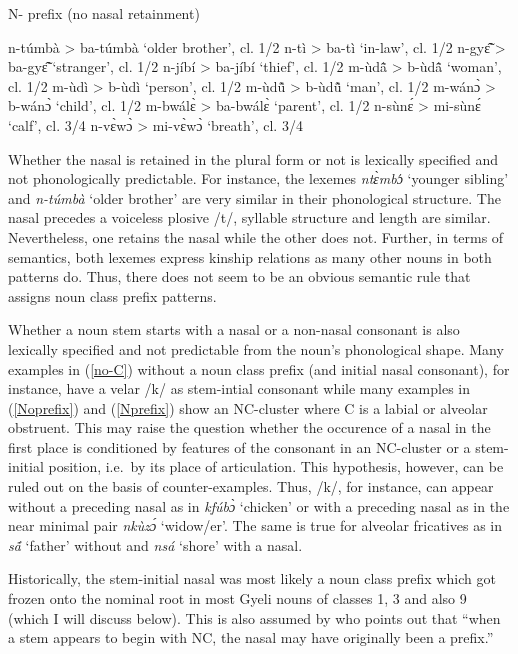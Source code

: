 \begin{exe} 
\ex\label{Nprefix} N- prefix (no nasal retainment)
\begin{xlist}
\ex n-túmbà > ba-túmbà `older brother', cl. 1/2
\ex n-tì >  ba-tì `in-law', cl. 1/2
\ex n-gyɛ̃̂ >  ba-gyɛ̃̂ `stranger', cl. 1/2
\ex n-jíbí >  ba-jíbí `thief', cl. 1/2
\ex m-ùdã̂ >  b-ùdã̂ `woman', cl. 1/2
\ex m-ùdì >  b-ùdì `person', cl. 1/2
\ex m-ùdũ̂ >  b-ùdũ̂ `man', cl. 1/2
\ex m-wánɔ̀ >  b-wánɔ̀ `child', cl. 1/2
\ex m-bwálɛ̀ >  ba-bwálɛ̀ `parent', cl. 1/2
\ex n-sùnɛ́ >  mi-sùnɛ́ `calf', cl. 3/4
\ex n-vɛ̀wɔ̀ >  mi-vɛ̀wɔ̀ `breath', cl. 3/4
\end{xlist}
\end{exe}

Whether the nasal is retained in the plural form or not is lexically specified and not phonologically predictable.  For instance, the lexemes {\itshape ntɛ̀mbɔ}́ `younger sibling' and {\itshape n-túmbà} `older brother' are very similar in their phonological structure. The nasal precedes a voiceless plosive /t/, syllable structure and length are similar. Nevertheless, one retains the nasal while the other does not.  Further, in terms of semantics, both lexemes express kinship relations as many other nouns in both patterns do. Thus, there does not seem to be an obvious semantic rule that assigns noun class prefix patterns.

Whether a noun stem starts with a nasal or a non-nasal consonant is also lexically specified and not predictable from the noun's phonological shape. Many examples in (\ref{no-C}) without a noun class prefix (and initial nasal consonant), for instance, have a velar /k/ as stem-intial consonant while many examples in (\ref{Noprefix}) and (\ref{Nprefix}) show an NC-cluster where C is a labial or alveolar obstruent. This may raise the question whether the occurence of a nasal in the first place is conditioned by features of the consonant in an NC-cluster or a stem-initial position, i.e.~by its place of articulation. This hypothesis, however, can be ruled out on the basis of counter-examples. Thus, /k/, for instance, can appear without a preceding nasal as in {\itshape kfúbɔ̀} `chicken' or with a preceding nasal as in the near minimal pair {\itshape nkùzɔ́} `widow/er'. The same is true for alveolar fricatives as in {\itshape sã́} `father' without and {\itshape nsá} `shore' with a nasal.

Historically, the stem-initial nasal was most likely a noun class prefix which got frozen onto the nominal root in most Gyeli nouns of classes 1, 3 and also 9 (which I will discuss below). This is also assumed by \citet[50]{hyman2003} who points out that ``when a stem appears to begin with NC, the nasal may have originally been a prefix.''

